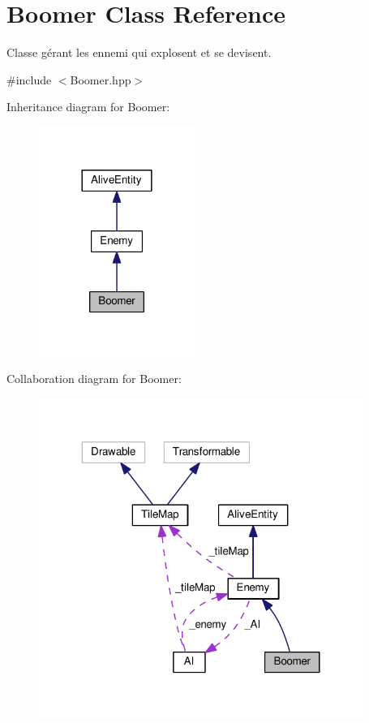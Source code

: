 \hypertarget{class_boomer}{\section{Boomer Class Reference}
\label{class_boomer}
}


Classe gérant les ennemi qui explosent et se devisent.  




{\ttfamily \#include $<$Boomer.\+hpp$>$}



Inheritance diagram for Boomer\+:
\nopagebreak
\begin{figure}[H]
\begin{center}
\leavevmode
\includegraphics[width=144pt]{class_boomer__inherit__graph}
\end{center}
\end{figure}


Collaboration diagram for Boomer\+:
\nopagebreak
\begin{figure}[H]
\begin{center}
\leavevmode
\includegraphics[width=299pt]{class_boomer__coll__graph}
\end{center}
\end{figure}
